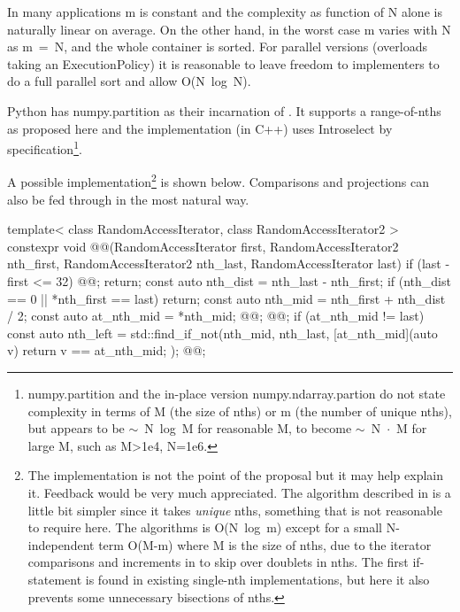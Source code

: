 In many applications m is constant and the complexity as function of N alone is naturally linear on average. On the other hand, in the worst case m varies with N as \mbox{m = N}, and the whole container is sorted. For parallel versions (overloads taking an ExecutionPolicy) it is reasonable to leave freedom to implementers to do a full parallel sort and allow \mbox{O(N log N)}.

Python has numpy.partition\cite{NpPart} as their incarnation of .
It supports a range-of-nths as proposed here and the implementation\cite{NPImpl} (in C++) uses \mbox{Introselect\cite{Musser1997}} by specification\footnote{numpy.partition and the in-place version numpy.ndarray.partion do not state complexity in terms of M (the size of nths) or m (the number of unique nths), but appears to be \mbox{$\sim$ N log M} for reasonable M, to become \mbox{$\sim$ N $\cdot$ M} for large M, such as M>1e4, N=1e6. }.

A possible implementation\footnote{
The implementation is not the point of the proposal but it may help explain it. Feedback would be very much appreciated. 
The algorithm described in \cite{Alsuwaiyel2001} is a little bit simpler since it takes \emph{unique} nths, something that is not reasonable to require here. The algorithms is \mbox{O(N log m)} except for a small N-independent term \mbox{O(M-m)} where M is the size of nths, due to the iterator comparisons and increments in  to skip over doublets in nths. The first if-statement is found in existing single-nth  implementations, but here it also prevents some unnecessary bisections of nths.}
is shown below. Comparisons and projections can also be fed through in the most natural way. 

\begin{codeblock}
template< class RandomAccessIterator, class RandomAccessIterator2 >
constexpr void @@(RandomAccessIterator first, 
  RandomAccessIterator2 nth_first, RandomAccessIterator2 nth_last, 
  RandomAccessIterator last)
{
  if (last - first <= 32) { @@; return; }
  const auto nth_dist = nth_last - nth_first;
  if (nth_dist == 0 || *nth_first == last) return;
  const auto nth_mid = nth_first + nth_dist / 2;
  const auto at_nth_mid = *nth_mid;
  @@;
  @@;
  if (at_nth_mid != last){
    const auto nth_left = std::find_if_not(nth_mid, nth_last, 
      [at_nth_mid](auto v) {return v == at_nth_mid; });
    @@;
  }
}

\end{codeblock}


